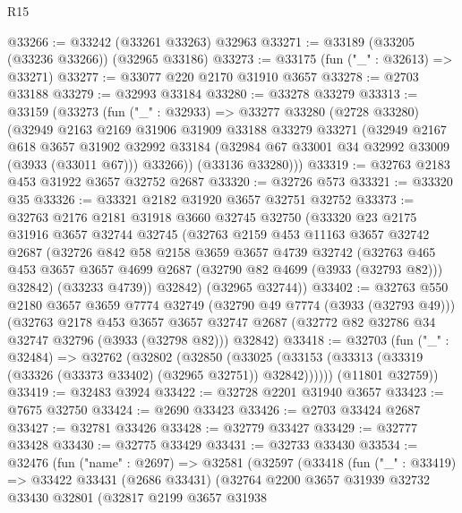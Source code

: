 \begin{lexlean}{R15}
\begin{coremodule}
@33266 := @33242 (@33261 @33263) @32963
@33271 := @33189 (@33205 (@33236 @33266)) (@32965 @33186)
@33273 := @33175 (fun ("_" : @32613) => @33271)
@33277 := @33077 @220 @2170 @31910 @3657
@33278 := @2703 @33188
@33279 := @32993 @33184
@33280 := @33278 @33279
@33313 := @33159
    (@33273
      (fun ("_" : @32933) =>
      @33277
        @33280
        (@2728 @33280)
        (@32949
          @2163
          @2169
          @31906
          @31909
          @33188
          @33279
          @33271
          (@32949
            @2167
            @618
            @3657
            @31902
            @32992
            @33184
            (@32984 @67 @33001 @34 @32992 @33009 (@3933 (@33011 @67)))
            @33266))
        (@33136 @33280)))
@33319 := @32763 @2183 @453 @31922 @3657 @32752 @2687
@33320 := @32726 @573
@33321 := @33320 @35
@33326 := @33321 @2182 @31920 @3657 @32751 @32752
@33373 := @32763
    @2176
    @2181
    @31918
    @3660
    @32745
    @32750
    (@33320
      @23
      @2175
      @31916
      @3657
      @32744
      @32745
      (@32763
        @2159
        @453
        @11163
        @3657
        @32742
        @2687
        (@32726
          @842
          @58
          @2158
          @3659
          @3657
          @4739
          @32742
          (@32763 @465 @453 @3657 @3657 @4699 @2687 (@32790 @82 @4699 (@3933 (@32793 @82))) @32842)
          (@33233 @4739))
        @32842)
      (@32965 @32744))
@33402 := @32763
    @550
    @2180
    @3657
    @3659
    @7774
    @32749
    (@32790 @49 @7774 (@3933 (@32793 @49)))
    (@32763
      @2178
      @453
      @3657
      @3657
      @32747
      @2687
      (@32772 @82 @32786 @34 @32747 @32796 (@3933 (@32798 @82)))
      @32842)
@33418 := @32703
    (fun ("_" : @32484) =>
    @32762
      (@32802
        (@32850
          (@33025 (@33153 (@33313 (@33319 (@33326 (@33373 @33402) (@32965 @32751)) @32842))))))
      (@11801 @32759))
@33419 := @32483 @3924
@33422 := @32728 @2201 @31940 @3657
@33423 := @7675 @32750
@33424 := @2690 @33423
@33426 := @2703 @33424 @2687
@33427 := @32781 @33426
@33428 := @32779 @33427
@33429 := @32777 @33428
@33430 := @32775 @33429
@33431 := @32733 @33430
@33534 := @32476
    (fun ("name" : @2697) =>
    @32581
      (@32597
        (@33418
          (fun ("_" : @33419) =>
          @33422
            @33431
            (@2686 @33431)
            (@32764
              @2200
              @3657
              @31939
              @32732
              @33430
              @32801
              (@32817
                @2199
                @3657
                @31938

\end{coremodule}
\end{lexlean}
